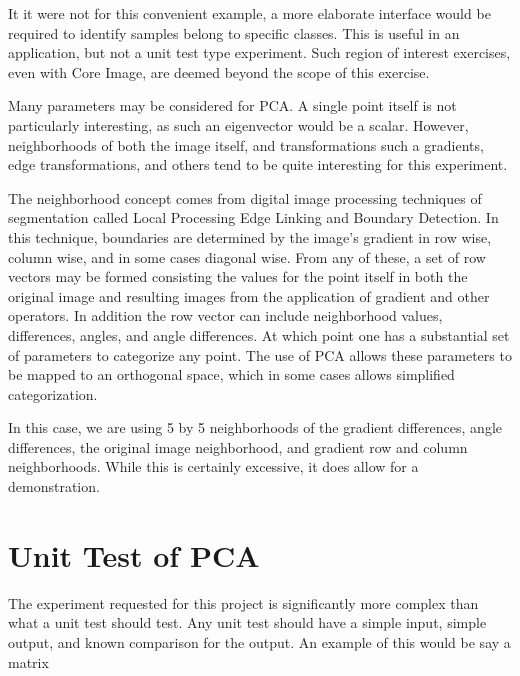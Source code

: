 \documentclass[11pt, twocolumn]{article}
\begin{document}
It it were not for this convenient example, a more elaborate interface would be required to identify samples belong to specific classes.  This is useful in an application, but not a unit test type experiment.  Such region of interest exercises, even with Core Image, are deemed beyond the scope of this exercise.  

Many parameters may be considered for PCA.  A single point itself is not particularly interesting, as such an eigenvector would be a scalar.  However, neighborhoods of both the image itself, and transformations such a gradients, edge transformations, and others tend to be quite interesting for this experiment.  

The neighborhood concept comes from digital image processing techniques of segmentation called Local Processing Edge Linking and Boundary Detection.   In this technique, boundaries are determined by the image's gradient in row wise, column wise, and in some cases diagonal wise.  From any of these, a set of row vectors may be formed consisting the values for the point itself in both the original image and resulting images from the application of gradient and other operators.  In addition the row vector can include neighborhood values, differences, angles, and angle differences.  At which point one has a substantial set of parameters to categorize any point.  The use of PCA allows these parameters to be mapped to an orthogonal space, which in some cases allows simplified categorization.  


In this case, we are using 5 by 5 neighborhoods of the gradient differences, angle differences, the original image neighborhood, and gradient row and column neighborhoods.   While this is certainly excessive, it does allow for a demonstration.   

\section{Unit Test of PCA}
The experiment requested for this project is significantly more complex than what a unit test should test.  Any unit test should have a simple input, simple output, and known comparison for the output.   An example of this would be say a matrix 
\end{document}
